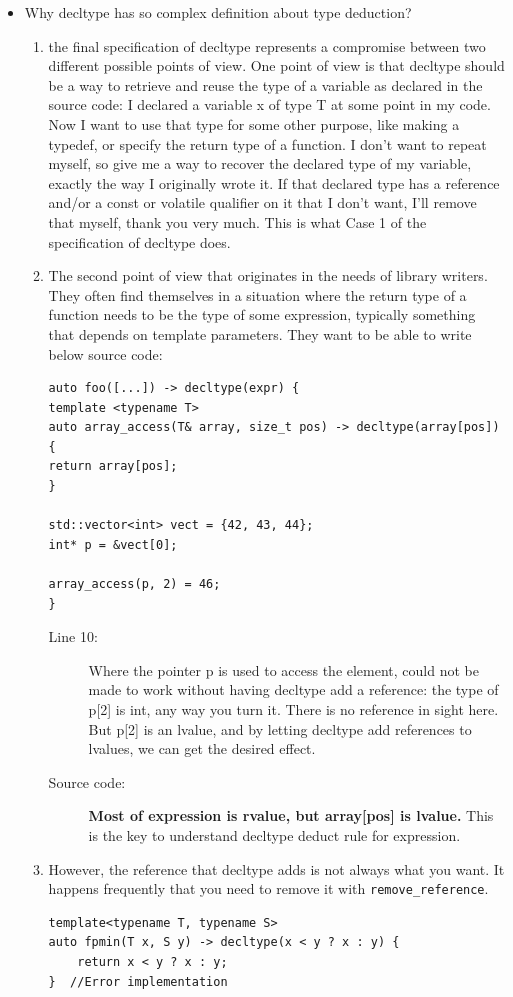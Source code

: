 \documentclass[a4paper,11pt,twoside]{book}
\begin{document}
\begin{itemize}
\item Why decltype has so complex definition about type deduction?
\begin{enumerate}
	\item the final specification of decltype represents a compromise between two different possible points of view. One point of view is that decltype should be a way to retrieve and reuse the type of a variable as declared in the source code: I declared a variable x of type T at some point in my code. Now I want to use that type for some other purpose, like making a typedef, or specify the return type of a function. I don't want to repeat myself, so give me a way to recover the declared type of my variable, exactly the way I originally wrote it. If that declared type has a reference and/or a const or volatile qualifier on it that I don't want, I'll remove that myself, thank you very much. This is what Case 1 of the specification of decltype does.
	
	\item  The second point of view that originates in the needs of library writers. They often find themselves in a situation where the return type of a function needs to be the type of some expression, typically something that depends on template parameters. They want to be able to write below source code:
\begin{lstlisting}
auto foo([...]) -> decltype(expr) {
template <typename T>
auto array_access(T& array, size_t pos) -> decltype(array[pos]) {
return array[pos];
}

std::vector<int> vect = {42, 43, 44};
int* p = &vect[0];

array_access(p, 2) = 46;
}
\end{lstlisting}
\begin{description}
	\item[Line 10:] Where the pointer p is used to access the element, could not be made to work without having decltype add a reference: the type of p[2] is int, any way you turn it. There is no reference in sight here. But p[2] is an lvalue, and by letting decltype add references to lvalues, we can get the desired effect. 
	
	\item[Source code:] \textbf{Most of expression is rvalue, but array[pos] is lvalue.} This is the key to understand decltype deduct rule for expression.
\end{description}

\item However, the reference that decltype adds is not always what you want. It happens frequently that you need to remove it with \texttt{remove\_reference}. 
\begin{lstlisting}
template<typename T, typename S>
auto fpmin(T x, S y) -> decltype(x < y ? x : y) {
	return x < y ? x : y;
}  //Error implementation 


\end{lstlisting}
\end{enumerate}
\end{itemize}
\end{document}
